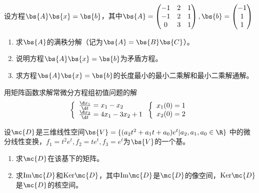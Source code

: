 \documentclass[12pt, a4paper, oneside, UTF8]{ctexbook}
\begin{document}
\begin{question}
    设方程$\bs{A}\bs{x}=\bs{b}$，其中$\bs{A}=\begin{pmatrix}
        -1&2&1\\
        -1&2&1\\
        0&3&1
    \end{pmatrix},\bs{b}=\begin{pmatrix}
        -1\\
        1\\
        1
    \end{pmatrix}$
    \begin{enumerate}[label=(\arabic{*})]
        \item 求$\bs{A}$的满秩分解（记为$\bs{A}=\bs{B}\bs{C}$）。
        \item 说明方程$\bs{A}\bs{x}=\bs{b}$为矛盾方程。
        \item 求方程$\bs{A}\bs{x}=\bs{b}$的长度最小的最小二乘解和最小二乘解通解。
    \end{enumerate}
\end{question}

\begin{question}
    用矩阵函数求解常微分方程组初值问题的解
    \begin{align*}
    \left\{
        \begin{array}{ll}
            \frac{\d x_1}{\d t}=x_1-x_2\\
            \frac{\d x_2}{\d t}=4x_1-3x_2+1
        \end{array}
        \right.
    \left\{
        \begin{array}{ll}
            x_1(0)=1\\
            x_2(0)=2
        \end{array}
        \right.
    \end{align*}
\end{question}

\begin{question}

    设$\mc{D}$是三维线性空间$\bs{V}=\{(a_2t^2+a_1t+a_0)e^t|a_2,a_1,a_0 \in \R\}$
    中的微分线性变换，$f_1=t^2e^t,f_2=te^t,f_3=e^t$为$\bs{V}$的一个基。
    \begin{enumerate}[label=(\arabic{*})]
        \item 求$\mc{D}$在该基下的矩阵。
        \item 求$\mathrm{Im}\mc{D}$和$\mathrm{Ker}\mc{D}$，其中$\mathrm{Im}\mc{D}$是$\mc{D}$的像空间，$\mathrm{Ker}\mc{D}$是$\mc{D}$的核空间。
    \end{enumerate}
\end{question}
\end{document}
